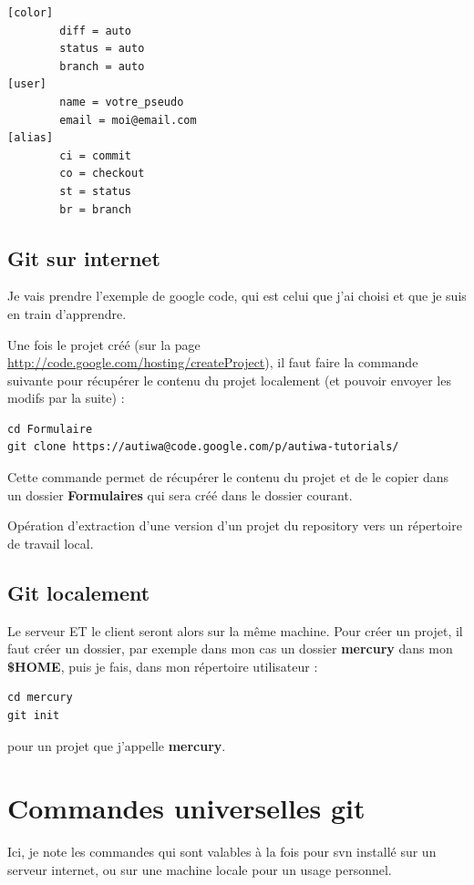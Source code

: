 \documentclass[a4paper,twoside]{article}
\begin{document}
\begin{verbatim}
[color]
        diff = auto
        status = auto
        branch = auto
[user]
        name = votre_pseudo
        email = moi@email.com
[alias]
        ci = commit
        co = checkout
        st = status
        br = branch
\end{verbatim}

\subsection{Git sur internet}
Je vais prendre l'exemple de google code, qui est celui que j'ai choisi et que je suis en train d'apprendre.


Une fois le projet créé (sur la page \url{http://code.google.com/hosting/createProject}), il faut faire la commande suivante pour récupérer le contenu du projet localement (et pouvoir envoyer les modifs par la suite) : 
\begin{verbatim}
cd Formulaire
git clone https://autiwa@code.google.com/p/autiwa-tutorials/ 
\end{verbatim}

Cette commande permet de récupérer le contenu du projet et de le copier dans un dossier \textbf{Formulaires} qui sera créé dans le dossier courant.

\begin{definition}[Clone]
Opération d'extraction d'une version d'un projet du repository vers un répertoire de travail local.
\end{definition}


\subsection{Git localement}\label{sec:git_init}
Le serveur ET le client seront alors sur la même machine. Pour créer un projet, il faut créer un dossier, par exemple dans mon cas un dossier \textbf{mercury} dans mon \textbf{\$HOME}, puis je fais, dans mon répertoire utilisateur : 
\begin{verbatim}
cd mercury
git init
\end{verbatim}
pour un projet que j'appelle \textbf{mercury}.

\section{Commandes universelles git}
Ici, je note les commandes qui sont valables à la fois pour svn installé sur un serveur internet, ou sur une machine locale pour un usage personnel.
\end{document}
